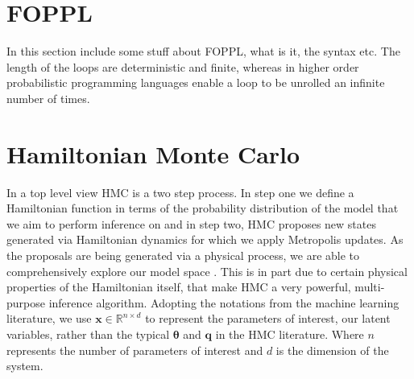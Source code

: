 \documentclass[twoside]{article}
\begin{document}
\section{FOPPL}
\label{sec:foppl}
In this section include some stuff about FOPPL, what is it, the syntax etc.  The length of the loops are deterministic and finite, whereas in higher order probabilistic programming languages enable a loop to be unrolled an infinite number of times. 
\section{Hamiltonian Monte Carlo}
\label{sec:hmc}
In a top level view HMC is a two step process. In step one we define a Hamiltonian function in terms of the probability distribution of the model that we aim to perform inference on and in step two, HMC proposes new states generated via Hamiltonian dynamics for which we apply Metropolis updates. As the proposals are being generated via a physical process, we are able to comprehensively explore our model space \citep{neal2011mcmc}. This is in part due to certain physical properties of the Hamiltonian itself, that make HMC a very powerful, multi-purpose inference algorithm. Adopting the notations from the machine learning literature, we use $\textbf{x} \in \mathbb{R}^{n \times d}$ to represent the parameters of interest, our latent variables, rather than the typical $\mathbf{\theta}$ and $\textbf{q}$ in the HMC literature. Where $n$ represents the number of parameters of interest and $d$ is the dimension of the system.
\end{document}
